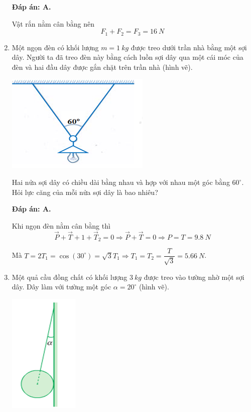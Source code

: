 \begin{enumerate}[label=\bfseries Câu \arabic*:]
	\loigiai
	{	\textbf{Đáp án: A.}	
		
	Vật rắn nằm cân bằng nên
	$$F_1 + F_2 = F_3 = \SI{16}{N}$$
	}
	
	
	
	\item {}
	
	\cauhoi
	{Một ngọn đèn có khối lượng $m=\SI{1}{kg}$ được treo dưới trần nhà bằng một sợi dây. Người ta đã treo đèn này bằng cách luồn sợi dây qua một cái móc của đèn và hai đầu dây được gắn chặt trên trần nhà (hình vẽ).
		\begin{center}
			\includegraphics[scale=1]{../figs/VN10-2021-PH-TP020-7.png}
		\end{center}
	
	Hai nửa sợi dây có chiều dài bằng nhau và hợp với nhau một góc bằng $60^\circ$. Hỏi lực căng của mỗi nửa sợi dây là bao nhiêu?
	}
	
	\loigiai
	{	\textbf{Đáp án: A.}
		
	Khi ngọn đèn nằm cân bằng thì
	$$\vec P + \vec T+1 + \vec T_2 = 0 \Rightarrow \vec P + \vec T = 0 \Rightarrow P = T = \SI{9,8}{N}$$
	
	Mà $T=2T_1 = \cos (30^\circ) = \sqrt{3} T_1 \Rightarrow T_1 = T_2 = \dfrac{T}{\sqrt{3}} = \SI{5.66}{N}$.
	}
	
	\item {}
	
	\cauhoi
	{Một quả cầu đồng chất có khối lượng $\SI{3}{kg}$ được treo vào tường nhờ một sợi dây. Dây làm với tường một góc $\alpha = 20^\circ$ (hình vẽ).
		\begin{center}
			\includegraphics[scale=1]{../figs/VN10-2021-PH-TP020-6.png}
		\end{center}
		
}
\end{enumerate}
